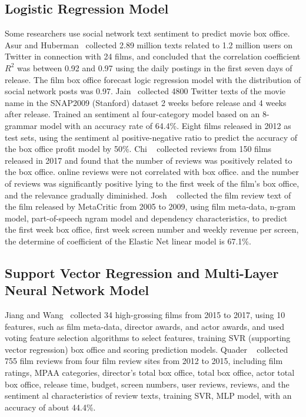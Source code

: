 \documentclass[review]{cvpr}
\begin{document}
\subsection{Logistic Regression Model}

Some researchers use social network text sentiment to predict movie box office.
Asur and Huberman~\cite{asur2010predicting} collected 2.89 million texts related to 1.2 million users on Twitter in connection with 24 films, and concluded that the correlation coefficient $R^2$ was between 0.92 and 0.97 using the daily postings in the first seven days of release.
The film box office forecast logic regression model with the distribution of social network posts was 0.97.
Jain~\cite{jain2013prediction} collected 4800 Twitter texts of the movie name in the SNAP2009 (Stanford) dataset 2 weeks before release and 4 weeks after release.
Trained an sentiment al four-category model based on an 8-grammar model with an accuracy rate of 64.4\%.
Eight films released in 2012 as test sets, using the sentiment al positive-negative ratio to predict the accuracy of the box office profit model by 50\%.
Chi \etal~\cite{chi2019does} collected reviews from 150 films released in 2017 and found that the number of reviews was positively related to the box office.
online reviews were not correlated with box office. and the number of reviews was significantly positive lying to the first week of the film's box office, and the relevance gradually diminished.
Josh \etal~\cite{joshi2010movie} collected the film review text of the film released by MetaCritic from 2005 to 2009, using film meta-data, n-gram model, part-of-speech ngram model and dependency characteristics, to predict the first week box office,
first week screen number and weekly revenue per screen, the determine of coefficient of the Elastic Net linear model is 67.1\%.

\subsection{Support Vector Regression and Multi-Layer Neural Network Model}

Jiang and Wang~\cite{jiang2018predicting} collected 34 high-grossing films from 2015 to 2017, using 10 features, such as film meta-data, director awards, and actor awards, and used voting feature selection algorithms to select features, training SVR (supporting vector regression) box office and scoring prediction models.
Quader \etal~\cite{quader2017machine} collected 755 film reviews from four film review sites from 2012 to 2015, including film ratings, MPAA categories, director's total box office, total box office, actor total box office, release time, budget, screen numbers, user reviews, reviews, and the sentiment al characteristics of review texts,
training SVR, MLP model, with an accuracy of about 44.4\%.
\end{document}
